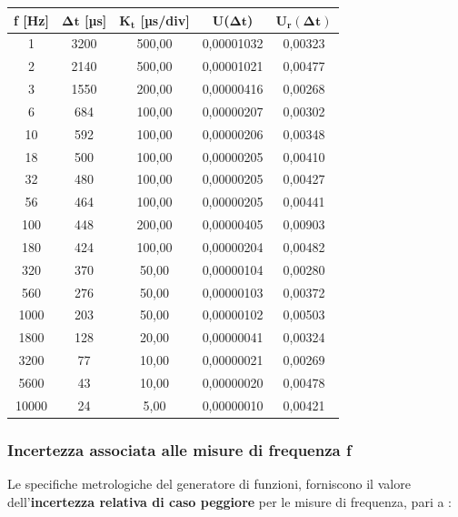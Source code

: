\begin{table}[!ht]
    \centering
    \begin{tabular}{|c|c|c|c|c|}
    \hline

        \textbf{f [Hz]} & \textbf{$\bm{\Delta t}$ [µs]} & \textbf{$\bm{K_t}$ [µs/div]} & \textbf{U($\bm{\Delta t}$)} & \textbf{$\bm{U_r(\Delta t)}$} \\ \hline

        1 & 3200 & 500,00 & 0,00001032 & 0,00323 \\ \hline
        2 & 2140 & 500,00 & 0,00001021 & 0,00477 \\ \hline
        3 & 1550 & 200,00 & 0,00000416 & 0,00268 \\ \hline
        6 & 684 & 100,00 & 0,00000207 & 0,00302 \\ \hline
        10 & 592 & 100,00 & 0,00000206 & 0,00348 \\ \hline
        18 & 500 & 100,00 & 0,00000205 & 0,00410 \\ \hline
        32 & 480 & 100,00 & 0,00000205 & 0,00427 \\ \hline
        56 & 464 & 100,00 & 0,00000205 & 0,00441 \\ \hline
        100 & 448 & 200,00 & 0,00000405 & 0,00903 \\ \hline
        180 & 424 & 100,00 & 0,00000204 & 0,00482 \\ \hline
        320 & 370 & 50,00 & 0,00000104 & 0,00280 \\ \hline
        560 & 276 & 50,00 & 0,00000103 & 0,00372 \\ \hline
        1000 & 203 & 50,00 & 0,00000102 & 0,00503 \\ \hline
        1800 & 128 & 20,00 & 0,00000041 & 0,00324 \\ \hline
        3200 & 77 & 10,00 & 0,00000021 & 0,00269 \\ \hline
        5600 & 43 & 10,00 & 0,00000020 & 0,00478 \\ \hline
        10000 & 24 & 5,00 & 0,00000010 & 0,00421 \\ \hline
    \end{tabular}
\end{table}
\FloatBarrier
\clearpage


\subsubsection*{Incertezza associata alle misure di frequenza f}

Le specifiche metrologiche del generatore di funzioni, forniscono il valore dell'\textbf{incertezza relativa di caso peggiore} per le misure di frequenza, pari a :

